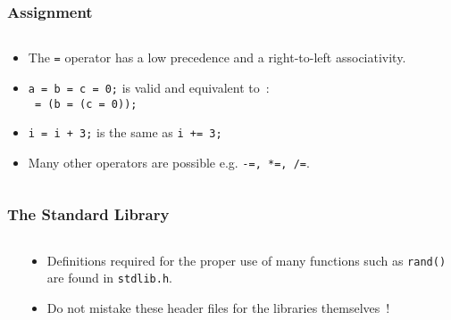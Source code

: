 \begin{frame}[fragile]
\frametitle{Assignment}

\begin{columns}
\begin{column}{0.5\textwidth}
\begin{itemize}[<+->]
\item The \verb$=$ operator has a low precedence
and a right-to-left associativity.
\item  \verb$a = b = c = 0;$ is valid and equivalent to~:\\
\verb$ = (b = (c = 0));$
\item  \verb$i = i + 3;$ is the same as \verb$i += 3;$
\item  Many other operators are possible e.g. \verb$-=, *=, /=$.
\end{itemize}
\end{column}

\begin{column}{0.5\textwidth}

\end{column}

\end{columns}
\end{frame}

\begin{frame}[fragile]
\frametitle{The Standard Library}
\begin{columns}

\begin{column}{0.60\textwidth}

\end{column}

\begin{column}{0.35\textwidth}
\begin{itemize}[<+->]
\item Definitions required for the proper use of
many functions such as \verb^rand()^
are found in \verb^stdlib.h^.
\item  Do not mistake these header files for the libraries
themselves~!
\end{itemize}
\end{column}

\end{columns}
\end{frame}
